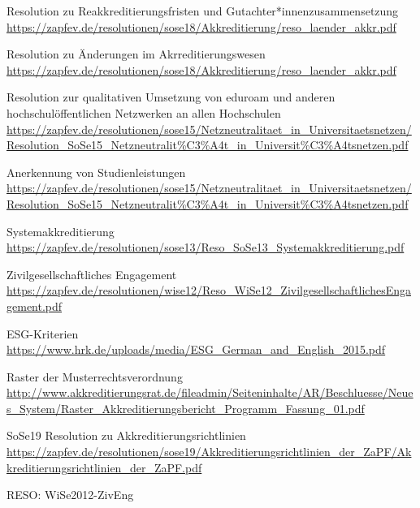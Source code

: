 \documentclass[a4paper]{scrartcl}
\begin{document}
\begin{thebibliography}{999}
 Resolution zu Reakkreditierungsfristen und Gutachter*innenzusammensetzung \url{https://zapfev.de/resolutionen/sose18/Akkreditierung/reso_laender_akkr.pdf}


 Resolution zu Änderungen im Akrreditierungswesen \url{https://zapfev.de/resolutionen/sose18/Akkreditierung/reso_laender_akkr.pdf}

 Resolution zur qualitativen Umsetzung von eduroam und anderen
hochschulöffentlichen Netzwerken an allen Hochschulen \url{https://zapfev.de/resolutionen/sose15/Netzneutralitaet_in_Universitaetsnetzen/Resolution_SoSe15_Netzneutralit\%C3\%A4t_in_Universit\%C3\%A4tsnetzen.pdf}

Anerkennung von Studienleistungen \url{https://zapfev.de/resolutionen/sose15/Netzneutralitaet_in_Universitaetsnetzen/Resolution_SoSe15_Netzneutralit\%C3\%A4t_in_Universit\%C3\%A4tsnetzen.pdf}

 Systemakkreditierung \url{https://zapfev.de/resolutionen/sose13/Reso_SoSe13_Systemakkreditierung.pdf}

 Zivilgesellschaftliches Engagement \url{https://zapfev.de/resolutionen/wise12/Reso_WiSe12_ZivilgesellschaftlichesEngagement.pdf}

\end{thebibliography}

\renewcommand\refname{Liste von ZaPF externen Quellen}
\begin{thebibliography}{999}


 ESG-Kriterien\\
\url{https://www.hrk.de/uploads/media/ESG_German_and_English_2015.pdf}

 Raster der Musterrechtsverordnung\\
\url{http://www.akkreditierungsrat.de/fileadmin/Seiteninhalte/AR/Beschluesse/Neues_System/Raster_Akkreditierungsbericht_Programm_Fassung_01.pdf}

 SoSe19 Resolution zu Akkreditierungsrichtlinien\\
\url{https://zapfev.de/resolutionen/sose19/Akkreditierungsrichtlinien_der_ZaPF/Akkreditierungsrichtlinien_der_ZaPF.pdf}

RESO: WiSe2012-ZivEng





\end{thebibliography}
\end{document}
